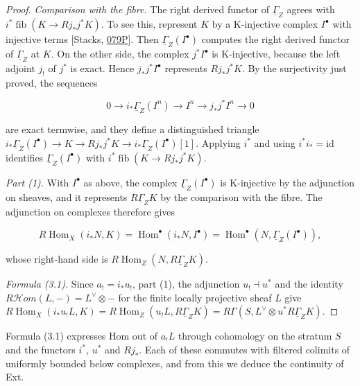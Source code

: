 \documentclass[11pt]{article}
\providecommand{\Hom}{}\renewcommand{\Hom}{\operatorname{Hom}}
\providecommand{\cHom}{}\renewcommand{\cHom}{R\mathcal{H}\!om}
\providecommand{\fib}{}\renewcommand{\fib}{\operatorname{fib}}
\begin{document}
\begin{proof}[{Proof}]
\emph{Comparison with the fibre.} The right derived functor of \(\underline\Gamma_Z\) agrees with \(i^*\fib(K\to Rj_*j^*K)\). To see this, represent \(K\) by a K-injective complex \(I^\bullet\) with injective terms [Stacks, \href{https://stacks.math.columbia.edu/tag/079P}{079P}]. Then \(\underline\Gamma_Z(I^\bullet)\) computes the right derived functor of \(\underline\Gamma_Z\) at \(K\). On the other side, the complex \(j^*I^\bullet\) is K-injective, because the left adjoint \(j_!\) of \(j^*\) is exact. Hence \(j_*j^*I^\bullet\) represents \(Rj_*j^*K\). By the surjectivity just proved, the sequences

\[
0\to i_*\underline\Gamma_Z(I^n)\to I^n\to j_*j^*I^n\to0
\]

are exact termwise, and they define a distinguished triangle \(i_*\underline\Gamma_Z(I^\bullet)\to K\to Rj_*j^*K\to i_*\underline\Gamma_Z(I^\bullet)[1]\). Applying \(i^*\) and using \(i^*i_*=\mathrm{id}\) identifies \(\underline\Gamma_Z(I^\bullet)\) with \(i^*\fib(K\to Rj_*j^*K)\).

\emph{Part (1).} With \(I^\bullet\) as above, the complex \(\underline\Gamma_Z(I^\bullet)\) is K-injective by the adjunction on sheaves, and it represents \(R\underline\Gamma_ZK\) by the comparison with the fibre. The adjunction on complexes therefore gives

\[
R\!\operatorname{Hom}_X(i_*N,K)=\Hom^\bullet(i_*N,I^\bullet)
=\Hom^\bullet(N,\underline\Gamma_Z(I^\bullet)),
\]

whose right-hand side is \(R\!\operatorname{Hom}_Z(N,R\underline\Gamma_ZK)\).

\emph{Formula (3.1).} Since \(a_!=i_*u_!\), part (1), the adjunction \(u_!\dashv u^*\) and the identity \(\cHom(L,-)=L^\vee\otimes-\) for the finite locally projective sheaf \(L\) give \(R\!\operatorname{Hom}_X(i_*u_!L,K)=R\!\operatorname{Hom}_Z(u_!L,R\underline\Gamma_ZK)
=R\Gamma(S,L^\vee\otimes u^*R\underline\Gamma_ZK)\).
\end{proof}

\label{bp67}%
Formula (3.1) expresses Hom out of \(a_!L\) through cohomology on the stratum \(S\) and the functors \(i^*\), \(u^*\) and \(Rj_*\). Each of these commutes with filtered colimits of uniformly bounded below complexes, and from this we deduce the continuity of Ext.
\end{document}
